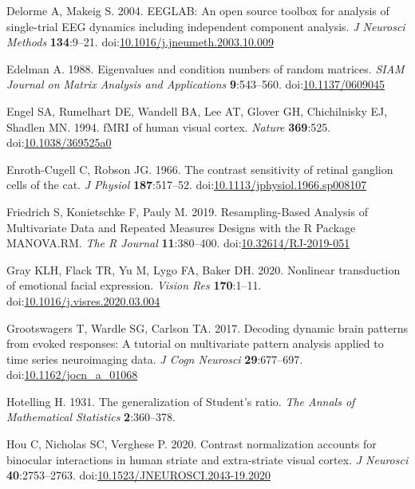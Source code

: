 \documentclass[]{article}
\begin{document}
\leavevmode\hypertarget{ref-Delorme2004}{}%
Delorme A, Makeig S. 2004. EEGLAB: An open source toolbox for analysis of single-trial EEG dynamics including independent component analysis. \emph{J Neurosci Methods} \textbf{134}:9--21. doi:\href{https://doi.org/10.1016/j.jneumeth.2003.10.009}{10.1016/j.jneumeth.2003.10.009}

\leavevmode\hypertarget{ref-Edelman1988}{}%
Edelman A. 1988. Eigenvalues and condition numbers of random matrices. \emph{SIAM Journal on Matrix Analysis and Applications} \textbf{9}:543--560. doi:\href{https://doi.org/10.1137/0609045}{10.1137/0609045}

\leavevmode\hypertarget{ref-Engel1994}{}%
Engel SA, Rumelhart DE, Wandell BA, Lee AT, Glover GH, Chichilnisky EJ, Shadlen MN. 1994. fMRI of human visual cortex. \emph{Nature} \textbf{369}:525. doi:\href{https://doi.org/10.1038/369525a0}{10.1038/369525a0}

\leavevmode\hypertarget{ref-Enroth-Cugell1966}{}%
Enroth-Cugell C, Robson JG. 1966. The contrast sensitivity of retinal ganglion cells of the cat. \emph{J Physiol} \textbf{187}:517--52. doi:\href{https://doi.org/10.1113/jphysiol.1966.sp008107}{10.1113/jphysiol.1966.sp008107}

\leavevmode\hypertarget{ref-Friedrich2019}{}%
Friedrich S, Konietschke F, Pauly M. 2019. Resampling-Based Analysis of Multivariate Data and Repeated Measures Designs with the R Package MANOVA.RM. \emph{The R Journal} \textbf{11}:380--400. doi:\href{https://doi.org/10.32614/RJ-2019-051}{10.32614/RJ-2019-051}

\leavevmode\hypertarget{ref-Gray2020}{}%
Gray KLH, Flack TR, Yu M, Lygo FA, Baker DH. 2020. Nonlinear transduction of emotional facial expression. \emph{Vision Res} \textbf{170}:1--11. doi:\href{https://doi.org/10.1016/j.visres.2020.03.004}{10.1016/j.visres.2020.03.004}

\leavevmode\hypertarget{ref-Grootswagers2017}{}%
Grootswagers T, Wardle SG, Carlson TA. 2017. Decoding dynamic brain patterns from evoked responses: A tutorial on multivariate pattern analysis applied to time series neuroimaging data. \emph{J Cogn Neurosci} \textbf{29}:677--697. doi:\href{https://doi.org/10.1162/jocn_a_01068}{10.1162/jocn\_a\_01068}

\leavevmode\hypertarget{ref-Hotelling1931}{}%
Hotelling H. 1931. The generalization of Student's ratio. \emph{The Annals of Mathematical Statistics} \textbf{2}:360--378.

\leavevmode\hypertarget{ref-Hou2020}{}%
Hou C, Nicholas SC, Verghese P. 2020. Contrast normalization accounts for binocular interactions in human striate and extra-striate visual cortex. \emph{J Neurosci} \textbf{40}:2753--2763. doi:\href{https://doi.org/10.1523/JNEUROSCI.2043-19.2020}{10.1523/JNEUROSCI.2043-19.2020}
\end{document}

